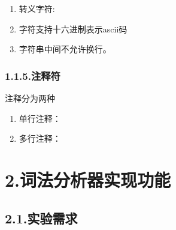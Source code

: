 \documentclass{article}
\begin{document}
\begin{enumerate}[noitemsep,topsep=\mdcompacttopsep]%

\item{}转义字符:%

\item{}字符支持十六进制表示ascii码%

\item{}字符串中间不允许换行。%
\end{enumerate}%

\subsubsection{1.1.5.\hspace*{0.5em}注释符}\label{section}%

\noindent{}注释分为两种%

\begin{enumerate}[noitemsep,topsep=\mdcompacttopsep]%

\item{}单行注释：\mdcode{//}%

\item{}多行注释： %
\end{enumerate}%

\section{2.\hspace*{0.5em}词法分析器实现功能}\label{section}%

\subsection{2.1.\hspace*{0.5em}实验需求}\label{section}%
\end{document}

